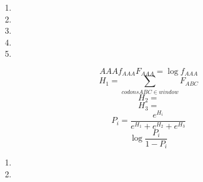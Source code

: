 \documentclass{homework}
\date{Montag, dem 3. Dezember 2012}
\author{Stefan Meißner (4279113) und Niels Hoppe (4356370)}
\begin{document}
\maketitle
\begin{enumerate} 

\begin{enumerate}
\item
\item
\item
\item
\item 
\end{enumerate}

$$AAA f_{AAA} F_{AAA} = \log f_{AAA}$$
$$H_1 = \sum_{codons ABC \in window} F_{ABC}$$
$$H_2 = $$
$$H_3 = $$
$$P_i = \frac{e^{H_i}}{e^{H_1} + e^{H_2} + e^{H_3}}$$
$$\log \frac{P_i}{1-P_i}$$

\begin{enumerate}
\item
\item
\end{enumerate}



\end{enumerate}
\end{document}
